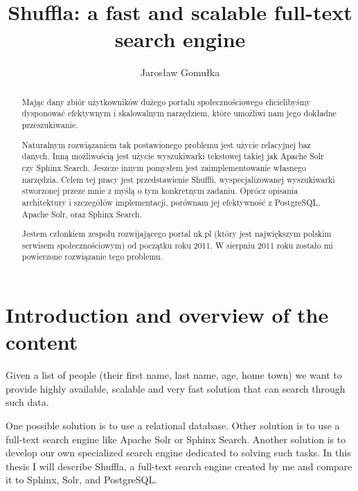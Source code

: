 \documentclass[10pt,a4paper]{article}
\begin{document}
\normalsize

\restoregeometry

\newpage
\thispagestyle{empty}

\begin{abstract}
Mając dany zbiór użytkowników dużego portalu społecznościowego chcielibyśmy dysponować efektywnym i skalowalnym narzędziem, które umożliwi nam jego dokładne przeszukiwanie.

Naturalnym rozwiązaniem tak postawionego problemu jest użycie relacyjnej baz danych. Inną możliwością jest użycie wyszukiwarki tekstowej takiej jak Apache Solr czy Sphinx Search. Jeszcze innym pomysłem jest zaimplementowanie własnego narzędzia. Celem tej pracy jest przedstawienie Shuffli, wyspecjalizowanej wyszukiwarki stworzonej przeze mnie z myślą o tym konkretnym zadaniu. Oprócz opisania architektury i szczegółów implementacji, porównam jej efektywność z PostgreSQL, Apache Solr, oraz Sphinx Search.

Jestem członkiem zespołu rozwijającego portal nk.pl (który jest największym polskim serwisem społecznościowym) od początku roku 2011. W sierpniu 2011 roku zostało mi powierzone rozwiązanie tego problemu.
\end{abstract}



\title{Shuffla: a fast and scalable full-text search engine}
\author{Jarosław Gomułka}

\maketitle


\section{Introduction and overview of the content}

Given a list of people (their first name, last name, age, home town) we want to provide highly available, scalable and very fast solution that can search through such data.

One possible solution is to use a relational database. Other solution is to use a full-text search engine like Apache Solr or Sphinx Search. Another solution is to develop our own specialized search engine dedicated to solving such tasks. In this thesis I will describe Shuffla, a full-text search engine created by me and compare it to Sphinx, Solr, and PostgreSQL. 
\end{document}
